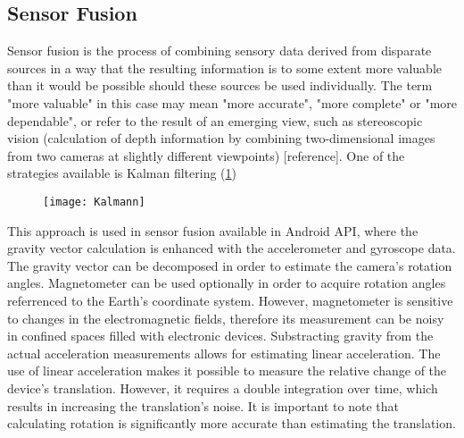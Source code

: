 \subsection{Sensor Fusion}
Sensor fusion is the process of combining sensory data derived from disparate
sources in a way that the resulting information is to some extent more valuable than it would be possible should these sources be used individually. The term "more valuable" in this case may mean "more
accurate", "more complete" or "more dependable", or refer to the result of an emerging view, such
as stereoscopic vision (calculation of depth information by combining two-dimensional
images from two cameras at slightly different viewpoints) [reference]. One of the strategies available is Kalman filtering (\ref{fig:Kalmann})
\begin{figure}[p]
    \centering
    \texttt{[image: Kalmann]}
    \caption{}
    \label{fig:Kalmann}
\end{figure}
This approach is used in sensor fusion available in Android API, where the gravity vector calculation is enhanced with the accelerometer and gyroscope data. The gravity vector can be decomposed in order to estimate the camera's rotation angles. Magnetometer can be used optionally in order to acquire rotation angles referrenced to the Earth's coordinate system. However, magnetometer is sensitive to changes in the electromagnetic fields, therefore its measurement can be noisy in confined spaces filled with electronic devices. Substracting gravity from the actual acceleration measurements allows for estimating linear acceleration. The use of linear acceleration makes it possible to measure the relative change of the device's translation. However, it requires a double integration over time, which results in increasing the translation's noise. It is important to note that calculating rotation is significantly more accurate than estimating the translation. 


